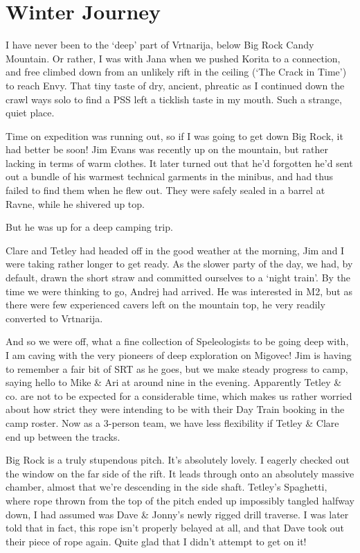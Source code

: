 \attrib{\izi}

\hypertarget{winter-journey}{%
\section{Winter Journey}\label{winter-journey}}

I have never been to the `deep' part of Vrtnarija, below Big Rock Candy
Mountain. Or rather, I was with Jana when we pushed Korita to a
connection, and free climbed down from an unlikely rift in the ceiling
(`The Crack in Time') to reach Envy. That tiny taste of dry, ancient,
phreatic as I continued down the crawl ways solo to find a PSS left a
ticklish taste in my mouth. Such a strange, quiet place.

Time on expedition was running out, so if I was going to get down Big
Rock, it had better be soon! Jim Evans was recently up on the mountain,
but rather lacking in terms of warm clothes. It later turned out that
he'd forgotten he'd sent out a bundle of his warmest technical garments
in the minibus, and had thus failed to find them when he flew out. They
were safely sealed in a barrel at Ravne, while he shivered up top.

But he was up for a deep camping trip.

Clare and Tetley had headed off in the good weather at the morning, Jim
and I were taking rather longer to get ready. As the slower party of the
day, we had, by default, drawn the short straw and committed ourselves
to a `night train'. By the time we were thinking to go, Andrej had
arrived. He was interested in M2, but as there were few experienced
cavers left on the mountain top, he very readily converted to Vrtnarija.

And so we were off, what a fine collection of Speleologists to be going
deep with, I am caving with the very pioneers of deep exploration on
Migovec! Jim is having to remember a fair bit of SRT as he goes, but we
make steady progress to camp, saying hello to Mike \& Ari at around nine
in the evening. Apparently Tetley \& co. are not to be expected for a
considerable time, which makes us rather worried about how strict they
were intending to be with their Day Train booking in the camp roster.
Now as a 3-person team, we have less flexibility if Tetley \& Clare end
up between the tracks.

Big Rock is a truly stupendous pitch. It's absolutely lovely. I eagerly
checked out the window on the far side of the rift. It leads through
onto an absolutely massive chamber, almost that we're descending in the
side shaft. Tetley's Spaghetti, where rope thrown from the top of the
pitch ended up impossibly tangled halfway down, I had assumed was Dave
\& Jonny's newly rigged drill traverse. I was later told that in fact,
this rope isn't properly belayed at all, and that Dave took out their
piece of rope again. Quite glad that I didn't attempt to get on it!

